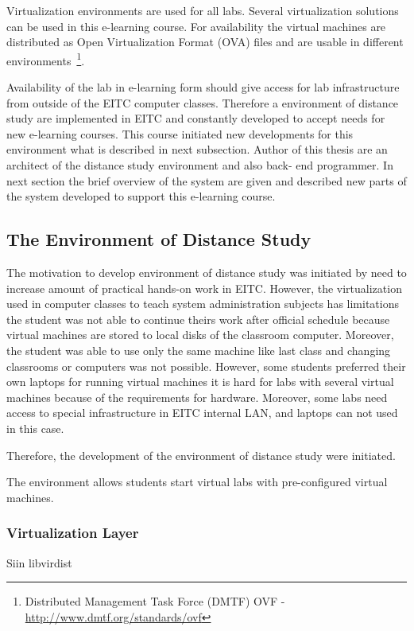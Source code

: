 Virtualization environments are used for all labs. Several virtualization solutions can be used in this e-learning course. For availability the virtual machines are distributed as Open Virtualization Format (\gls{OVA}) files and are usable in different environments~\footnote{ Distributed Management Task Force (\gls{DMTF}) OVF - \url{http://www.dmtf.org/standards/ovf}}.

Availability of the lab in e-learning form should give access for lab infrastructure from outside of the \gls{EITC} computer classes. Therefore a environment of distance study are implemented in \gls{EITC} and constantly developed to accept needs for new e-learning courses. This course initiated new developments for this environment what is described in next subsection.
Author of this thesis are an architect of the distance study environment and also back- end programmer. In next section the brief overview of the system are given and described new parts of the system developed to support this e-learning course.

\subsection{The Environment of Distance Study}
\label{The Environment of Distance Study}
The motivation to develop environment of distance study was initiated by need to increase amount of practical hands-on work in \gls{EITC}. However, the virtualization used in computer classes to teach system administration subjects has limitations the student was not able to continue theirs work after official schedule because virtual machines are stored to local disks of the classroom computer. Moreover, the student was able to use only the same machine like last class and changing classrooms or computers was not possible. However, some students preferred their own laptops for running virtual machines it is hard for labs with several virtual machines because of the requirements for hardware. Moreover, some labs need access to special infrastructure in \gls{EITC} internal LAN, and laptops can not used in this case.

Therefore, the development of the environment of distance study were initiated.

The environment allows students start virtual labs with pre-configured virtual machines. 


\subsubsection{Virtualization Layer}
Siin libvirdist
